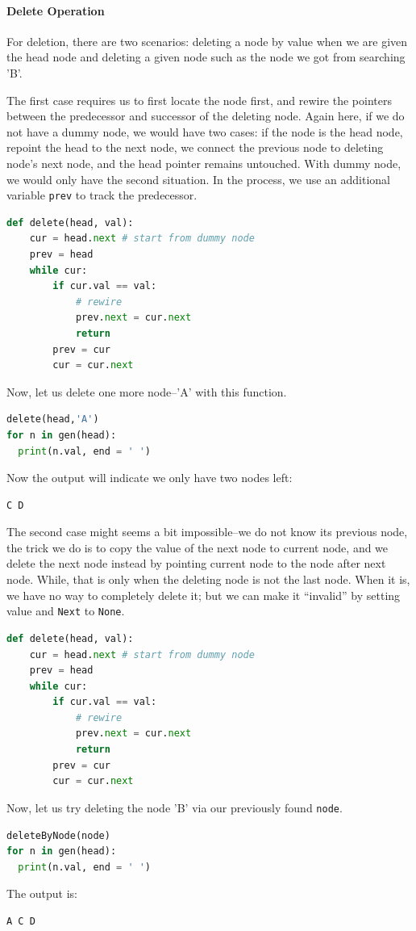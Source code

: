 \documentclass[../main.tex]{subfiles}
\begin{document}
\paragraph{Delete Operation} For deletion, there are two scenarios: deleting a node by value when we are given the head node and deleting a given node such as the node we got from searching 'B'.

The first case requires us to first locate the node first, and rewire the pointers between the predecessor and successor of the deleting node. Again here, if we do not have a dummy node, we would have two cases: if the node is the head node, repoint the head to the next node,   we connect the previous node to deleting node's next node, and the head pointer remains untouched. With dummy node, we would only have the second situation. In the process, we use an additional variable \texttt{prev} to track the predecessor. 
\begin{lstlisting}[language=Python]
def delete(head, val):
    cur = head.next # start from dummy node
    prev = head
    while cur:
        if cur.val == val:
            # rewire
            prev.next = cur.next
            return
        prev = cur
        cur = cur.next
\end{lstlisting}
Now, let us delete one more node--'A' with this function.
\begin{lstlisting}[language=Python]
delete(head,'A')
for n in gen(head):
  print(n.val, end = ' ')
\end{lstlisting}
Now the output will indicate we only have two nodes left:
\begin{lstlisting}[language=Python]
C D 
\end{lstlisting}

The  second case might seems a bit impossible--we do not know its previous node, the trick we do is to copy the value of the next node to current node, and we delete the next node instead by pointing current node to the node after next node. While, that is only when the deleting node is not the last node. When it is, we have no way to completely delete it; but we can make it ``invalid'' by setting value and  \texttt{Next} to \texttt{None}.
\begin{lstlisting}[language=Python]
def delete(head, val):
    cur = head.next # start from dummy node
    prev = head
    while cur:
        if cur.val == val:
            # rewire
            prev.next = cur.next
            return
        prev = cur
        cur = cur.next
\end{lstlisting}
Now, let us try deleting the node 'B' via our previously found \texttt{node}.
\begin{lstlisting}[language=Python]
deleteByNode(node)
for n in gen(head):
  print(n.val, end = ' ')
\end{lstlisting}
The output is:
\begin{lstlisting}[language=Python]
A C D 
\end{lstlisting}
\end{document}
